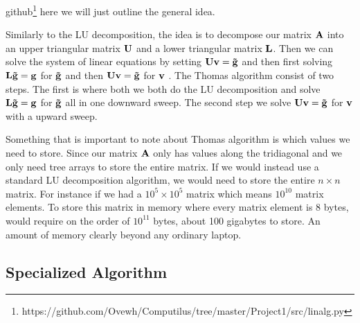 github\footnote{https://github.com/Ovewh/Computilus/tree/master/Project1/src/linalg.py}
here we will just outline the general idea. \par Similarly to the LU
decomposition, the idea is to decompose our matrix $\mathbf{A}$ into an upper
triangular matrix $\mathbf{U}$ and a lower triangular matrix $\mathbf{L}$. Then we
can solve the system of linear equations by setting $\mathbf{U}\mathbf{v}=
\mathbf{\tilde{g}}$ and then first solving 
$\mathbf{L} \mathbf{\tilde{g}} = \mathbf{g}$ for $\mathbf{\tilde{g}}$ and then 
$\mathbf{U}\mathbf{v} = \mathbf{\tilde{g}}$ for $\mathbf{v}$
\cite{tridia}. The Thomas algorithm consist of two steps. The first is where
both we both do the LU decomposition and solve $\mathbf{L} \mathbf{\tilde{g}} =
\mathbf{g}$ for $\mathbf{\tilde{g}}$ all in one downward sweep. The second step we
solve $\mathbf{U}\mathbf{v} = \mathbf{\tilde{g}}$ for $\mathbf{v}$ with a upward sweep. 

Something that is important to note about Thomas algorithm is which
values we need to store. Since our matrix $\mathbf{A}$ only has values along
the tridiagonal and we only need tree arrays to store the entire matrix. If we
would instead use a standard LU decomposition algorithm, we would need to store
the entire $n \times n$ matrix. For instance if we had a $10^5 \times 10^5$   
matrix which means $10^10$ matrix elements. To store this matrix in memory where
every matrix element is 8 bytes, would require on the order of $10^{11}$ bytes, 
about 100 gigabytes to store. An amount of memory clearly beyond any
ordinary laptop. 

\subsection*{Specialized Algorithm}
